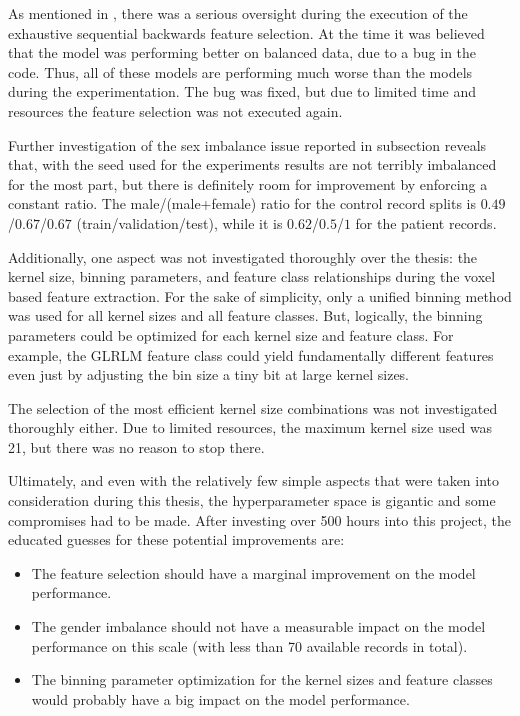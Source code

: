 As mentioned in , there was a serious oversight during the execution of the exhaustive sequential backwards feature selection. At the time it was believed that the model was performing better on balanced data, due to a bug in the code. Thus, all of these models are performing much worse than the models during the experimentation. The bug was fixed, but due to limited time and resources the feature selection was not executed again.\par
Further investigation of the sex imbalance issue reported in subsection  reveals that, with the seed used for the experiments results are not terribly imbalanced for the most part, but there is definitely room for improvement by enforcing a constant ratio. The male/(male+female) ratio for the control record splits is $0.49$/$0.67$/$0.67$ (train/validation/test), while it is $0.62$/$0.5$/$1$ for the patient records.\par
Additionally, one aspect was not investigated thoroughly over the thesis: the kernel size, binning parameters, and feature class relationships during the voxel based feature extraction. For the sake of simplicity, only a unified binning method was used for all kernel sizes and all feature classes. But, logically, the binning parameters could be optimized for each kernel size and feature class. For example, the \ac{GLRLM} feature class could yield fundamentally different features even just by adjusting the bin size a tiny bit at large kernel sizes.\par
The selection of the most efficient kernel size combinations was not investigated thoroughly either. Due to limited resources, the maximum kernel size used was 21, but there was no reason to stop there.\par
Ultimately, and even with the relatively few simple aspects that were taken into consideration during this thesis, the hyperparameter space is gigantic and some compromises had to be made. After investing over 500 hours into this project, the educated guesses for these potential improvements are:
\begin{itemize}
  \item The feature selection should have a marginal improvement on the model performance.
  \item The gender imbalance should not have a measurable impact on the model performance on this scale (with less than 70 available records in total).
  \item The binning parameter optimization for the kernel sizes and feature classes would probably have a big impact on the model performance.
\end{itemize}
